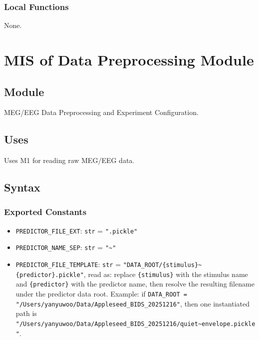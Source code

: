 \documentclass[12pt, titlepage]{article}
\begin{document}
\subsubsection{Local Functions}

None.

\newpage
\section{MIS of Data Preprocessing Module} \label{MIS:Input} 



\subsection{Module}
MEG/EEG Data Preprocessing and Experiment Configuration.

\subsection{Uses}
Uses M1 for reading raw MEG/EEG data.


\subsection{Syntax}

\subsubsection{Exported Constants}
\begin{itemize}
\item \texttt{PREDICTOR\_FILE\_EXT}: \texttt{str} = \texttt{".pickle"}
\item \texttt{PREDICTOR\_NAME\_SEP}: \texttt{str} = \texttt{"\textasciitilde"}
\item \texttt{PREDICTOR\_FILE\_TEMPLATE}: \texttt{str} = \texttt{"DATA\_ROOT/\{stimulus\}\textasciitilde\{predictor\}.pickle"}, read as: replace \texttt{\{stimulus\}} with the stimulus name and \texttt{\{predictor\}} with the predictor name, then resolve the resulting filename under the predictor data root. Example: if \texttt{DATA\_ROOT = "/Users/yanyuwoo/Data/Appleseed\_BIDS\_20251216"}, then one instantiated path is \texttt{"/Users/yanyuwoo/Data/Appleseed\_BIDS\_20251216/quiet\textasciitilde envelope.pickle"}.
\end{itemize}
\end{document}
